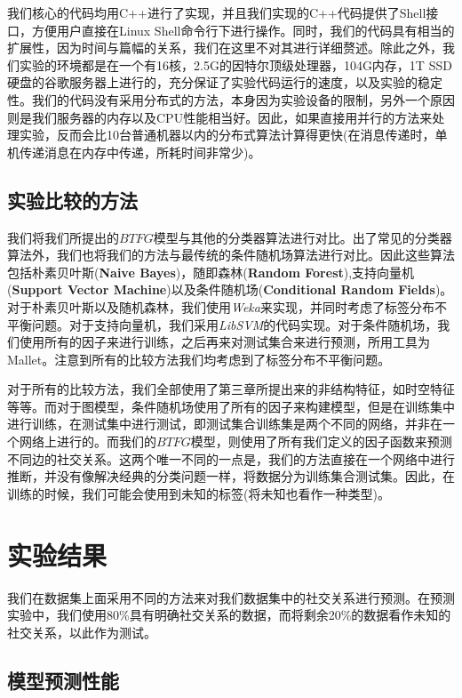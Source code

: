 我们核心的代码均用C++进行了实现，并且我们实现的C++代码提供了Shell接口，方便用户直接在Linux Shell命令行下进行操作。同时，我们的代码具有相当的扩展性，因为时间与篇幅的关系，我们在这里不对其进行详细赘述。除此之外，我们实验的环境都是在一个有16核，2.5G的因特尔顶级处理器，104G内存，1T SSD硬盘的谷歌服务器上进行的，充分保证了实验代码运行的速度，以及实验的稳定性。我们的代码没有采用分布式的方法，本身因为实验设备的限制，另外一个原因则是我们服务器的内存以及CPU性能相当好。因此，如果直接用并行的方法来处理实验，反而会比10台普通机器以内的分布式算法计算得更快(在消息传递时，单机传递消息在内存中传递，所耗时间非常少)。


\subsection{实验比较的方法}

我们将我们所提出的$BTFG$模型与其他的分类器算法进行对比。出了常见的分类器算法外，我们也将我们的方法与最传统的条件随机场算法进行对比。因此这些算法包括朴素贝叶斯(\textbf{Naive Bayes})，随即森林(\textbf{Random Forest}),支持向量机(\textbf{Support Vector Machine})以及条件随机场(\textbf{Conditional Random Fields})。对于朴素贝叶斯以及随机森林，我们使用\textit{Weka}来实现，并同时考虑了标签分布不平衡问题。对于支持向量机，我们采用\textit{LibSVM}的代码实现。对于条件随机场，我们使用所有的因子来进行训练，之后再来对测试集合来进行预测，所用工具为Mallet。注意到所有的比较方法我们均考虑到了标签分布不平衡问题。

对于所有的比较方法，我们全部使用了第三章所提出来的非结构特征，如时空特征等等。而对于图模型，条件随机场使用了所有的因子来构建模型，但是在训练集中进行训练，在测试集中进行测试，即测试集合训练集是两个不同的网络，并非在一个网络上进行的。而我们的$BTFG$模型，则使用了所有我们定义的因子函数来预测不同边的社交关系。这两个唯一不同的一点是，我们的方法直接在一个网络中进行推断，并没有像解决经典的分类问题一样，将数据分为训练集合测试集。因此，在训练的时候，我们可能会使用到未知的标签(将未知也看作一种类型)。


\section{实验结果}
我们在数据集上面采用不同的方法来对我们数据集中的社交关系进行预测。在预测实验中，我们使用80\%具有明确社交关系的数据，而将剩余20\%的数据看作未知的社交关系，以此作为测试。

\subsection{模型预测性能}



